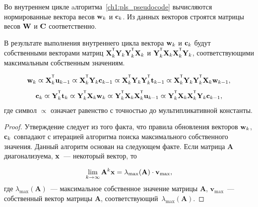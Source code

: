 Во внутреннем цикле aлгоритма~\ref{ch1:pls_pseudocode} вычисляются нормированные вектора весов $\mathbf{w}_k$ и $\mathbf{c}_k$. 
Из данных векторов строятся матрицы весов $\mathbf{W}$ и $\mathbf{C}$ соответственно.

\begin{statement}
	В результате выполнения внутреннего цикла вектора $\mathbf{w}_k$ и $\mathbf{c}_k$ будут собственными векторами матриц $\bX_k^{\T} \bY_k \bY_k^{\T} \bX_k$ и $\bY_k^{\T} \bX_k \bX_k^{\T} \bY_k$, соответствующими максимальным собственным значениям.
	
	\begin{equation*}
		\bw_k \varpropto \bX_k^{\T} \bu_{k-1} \varpropto \bX_k^{\T} \bY_k \bc_{k-1} \varpropto \bX_k^{\T} \bY_k \bY_k^{\T} \bt_{k-1} \varpropto \bX_k^{\T} \bY_k \bY_k^{\T} \bX_k \bw_{k-1},
	\end{equation*}
	\begin{equation*}
		\bc_k \varpropto \bY_k^{\T} \bt_k \varpropto \bY_k^{\T} \bX_k \bw_k \varpropto \bY_k^{\T} \bX_k \bX_k^{\T} \bu_{k-1} \varpropto \bY_k^{\T} \bX_k \bX_k^{\T} \bY_k \bc_{k-1},
	\end{equation*}
	где символ $\varpropto$ означает равенство с точностью до мультипликативной константы. 
	\label{st:eig}
\end{statement}
\begin{proof}
	Утверждение следует из того факта, что правила обновления векторов $\mathbf{w}_k$, $\mathbf{c}_k$ совпадают с итерацией алгоритма поиска максимального собственного значения. 
	Данный алгоритм основан на следующем факте.
	Если матрица $\mathbf{A}$ диагонализуема, $\mathbf{x}$~--- некоторый вектор, то
	
	\[
	\lim_{k \rightarrow \infty} \mathbf{A}^k \mathbf{x} = \lambda_{\max}(\mathbf{A}) \cdot \mathbf{v}_{\max},
	\]
	где $ \lambda_{\max} (\mathbf{A})$~--- максимальное собственное значение матрицы $\mathbf{A}$, $\mathbf{v}_{\max}$~---собственный вектор матрицы $\mathbf{A}$, соответствующий~$\lambda_{\max} (\mathbf{A})$.
	
\end{proof}


